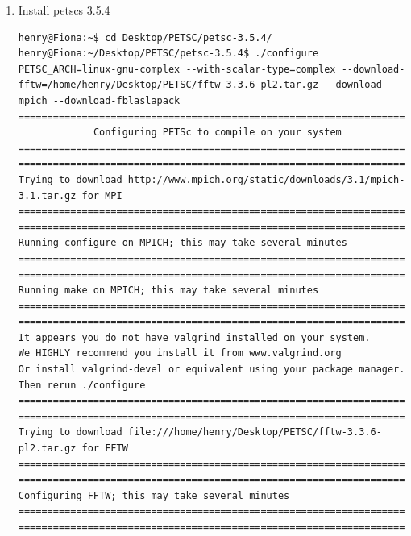 \documentclass{article}
\begin{document}
\begin{enumerate}
\tiny
\begin{verbatim}

\end{verbatim}
\normalsize

\tiny
\begin{verbatim}

\end{verbatim}
\normalsize

\item Install petscs 3.5.4
\tiny
\begin{verbatim}
henry@Fiona:~$ cd Desktop/PETSC/petsc-3.5.4/
henry@Fiona:~/Desktop/PETSC/petsc-3.5.4$ ./configure PETSC_ARCH=linux-gnu-complex --with-scalar-type=complex --download-fftw=/home/henry/Desktop/PETSC/fftw-3.3.6-pl2.tar.gz --download-mpich --download-fblaslapack 
===============================================================================
             Configuring PETSc to compile on your system                       
===============================================================================
===============================================================================
Trying to download http://www.mpich.org/static/downloads/3.1/mpich-3.1.tar.gz for MPI
===============================================================================
===============================================================================
Running configure on MPICH; this may take several minutes
===============================================================================
===============================================================================
Running make on MPICH; this may take several minutes
===============================================================================
===============================================================================
It appears you do not have valgrind installed on your system.
We HIGHLY recommend you install it from www.valgrind.org
Or install valgrind-devel or equivalent using your package manager.
Then rerun ./configure 
===============================================================================
===============================================================================
Trying to download file:///home/henry/Desktop/PETSC/fftw-3.3.6-pl2.tar.gz for FFTW
===============================================================================
===============================================================================
Configuring FFTW; this may take several minutes
===============================================================================
===============================================================================

\end{verbatim}
\end{enumerate}
\end{document}

